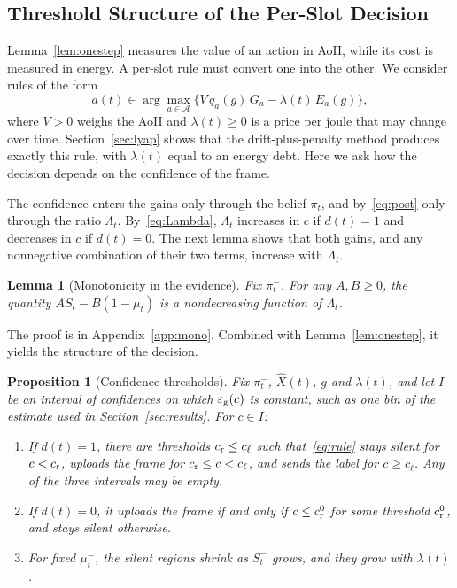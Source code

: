 \documentclass[5p,twocolumn]{elsarticle}
\newtheorem{lemma}{Lemma}
\newtheorem{proposition}{Proposition}
\theoremstyle{remark}
\newcommand{\A}{\mathcal{A}}
\newcommand{\lab}{\ell}
\newcommand{\ee}{\varepsilon}
\begin{document}
\subsection{Threshold Structure of the Per-Slot Decision}
Lemma~\ref{lem:onestep} measures the value of an action in AoII, while its cost is measured in energy. A per-slot rule must convert one into the other. We consider rules of the form
\begin{equation}\label{eq:rule}
a(t)\in\arg\max_{a\in\A}\big\{V\,q_a(g)\,G_a-\lambda(t)\,E_a(g)\big\},
\end{equation}
where $V>0$ weighs the AoII and $\lambda(t)\ge0$ is a price per joule that may change over time. Section~\ref{sec:lyap} shows that the drift-plus-penalty method produces exactly this rule, with $\lambda(t)$ equal to an energy debt. Here we ask how the decision depends on the confidence of the frame.

The confidence enters the gains only through the belief $\pi_t$, and by~\eqref{eq:post} only through the ratio $\Lambda_t$. By~\eqref{eq:Lambda}, $\Lambda_t$ increases in $c$ if $d(t)=1$ and decreases in $c$ if $d(t)=0$. The next lemma shows that both gains, and any nonnegative combination of their two terms, increase with $\Lambda_t$.

\begin{lemma}[Monotonicity in the evidence]\label{lem:mono}
Fix $\pi^-_t$. For any $A,B\ge0$, the quantity $AS_t-B(1-\mu_t)$ is a nondecreasing function of $\Lambda_t$.
\end{lemma}

The proof is in Appendix~\ref{app:mono}. Combined with Lemma~\ref{lem:onestep}, it yields the structure of the decision.

\begin{proposition}[Confidence thresholds]\label{prop:threshold}
Fix $\pi^-_t$, $\hat X(t)$, $g$ and $\lambda(t)$, and let $I$ be an interval of confidences on which $\ee_{\rm g}(c)$ is constant, such as one bin of the estimate used in Section~\ref{sec:results}. For $c\in I$:
\begin{enumerate}
\item[(a)] If $d(t)=1$, there are thresholds $c_{\rm r}\le c_{\lab}$ such that~\eqref{eq:rule} stays silent for $c<c_{\rm r}$, uploads the frame for $c_{\rm r}\le c<c_{\lab}$, and sends the label for $c\ge c_{\lab}$. Any of the three intervals may be empty.
\item[(b)] If $d(t)=0$, it uploads the frame if and only if $c\le c^0_{\rm r}$ for some threshold $c^0_{\rm r}$, and stays silent otherwise.
\item[(c)] For fixed $\mu^-_t$, the silent regions shrink as $S^-_t$ grows, and they grow with $\lambda(t)$.
\end{enumerate}
\end{proposition}
\end{document}
